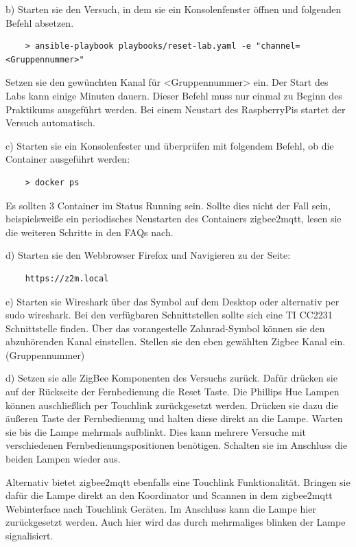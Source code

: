 b) Starten sie den Versuch, in dem sie ein Konsolenfenster öffnen und folgenden Befehl absetzen.

\begin{lstlisting}
    > ansible-playbook playbooks/reset-lab.yaml -e "channel=<Gruppennummer>"
\end{lstlisting}

Setzen sie den gewünchten Kanal für <Gruppennummer> ein. Der Start des Labs kann einige Minuten dauern. Dieser Befehl muss nur einmal zu Beginn
des Praktikums ausgeführt werden. Bei einem Neustart des RaspberryPis startet der Versuch automatisch.

c) Starten sie ein Konsolenfester und überprüfen mit folgendem Befehl, ob die Container ausgeführt werden:
\begin{lstlisting}
    > docker ps
\end{lstlisting}

Es sollten 3 Container im Status \grqq Running\grqq{} sein. Sollte dies nicht der Fall sein, beispielsweiße ein periodisches Neustarten des Containers 
\grqq zigbee2mqtt\grqq{}, lesen sie die weiteren Schritte in den FAQs nach.

d) Starten sie den Webbrowser Firefox und Navigieren zu der Seite:
\begin{lstlisting}
    https://z2m.local
\end{lstlisting}

e) Starten sie Wireshark über das Symbol auf dem Desktop oder alternativ per \grqq sudo wireshark\grqq{}. Bei den verfügbaren Schnittstellen sollte sich eine 
\grqq TI CC2231\grqq{} Schnittstelle finden. Über das vorangestelle Zahnrad-Symbol können sie den abzuhörenden
 Kanal einstellen. Stellen sie den eben gewählten Zigbee Kanal ein. (Gruppennummer)

d) Setzen sie alle ZigBee Komponenten des Versuchs zurück. Dafür drücken sie auf der Rückseite der Fernbedienung die Reset Taste.
Die Phillips Hue Lampen können auschließlich per Touchlink zurückgesetzt werden. Drücken sie dazu die äußeren Taste der Fernbedienung und halten diese direkt an 
die Lampe. Warten sie bis die Lampe mehrmals aufblinkt. Dies kann mehrere Versuche mit verschiedenen Fernbedienungspositionen benötigen. Schalten sie im Anschluss
die beiden Lampen wieder aus.

Alternativ bietet zigbee2mqtt ebenfalls eine Touchlink Funktionalität. Bringen sie dafür die Lampe direkt an den Koordinator und Scannen in dem zigbee2mqtt Webinterface nach 
Touchlink Geräten. Im Anschluss kann die Lampe hier zurückgesetzt werden. Auch hier wird das durch mehrmaliges blinken der Lampe signalisiert.

